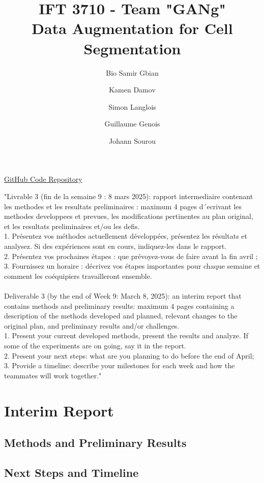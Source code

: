 \documentclass[]{article}
\title{\textbf{IFT 3710 - Team "GANg"} \\ 
\textbf{Data Augmentation for Cell Segmentation}}
\author[1]{Bio Samir Gbian}
\author[1]{Kamen Damov}
\author[1]{Simon Langlois}
\author[1]{Guillaume Genois}
\author[1]{Johann Sourou}
\affil{Departement of Computer Science and Operations Research}
\affil[1]{University of Montreal}
\begin{document}
\maketitle

\href{https://github.com/KamenDamov/IFT3710-Advanced-Project-in-ML-AI}{GitHub Code Repository}

"Livrable 3 (fin de la semaine 9 : 8 mars 2025): rapport intermediaire contenant les methodes et les resultats preliminaires : maximum 4 pages d´ecrivant les methodes developpees et prevues, les modifications pertinentes au plan original, et les resultats preliminaires et/ou les defis.
\\
1. Présentez vos méthodes actuellement développées, présentez les résultats et analysez. Si des expériences sont en cours, indiquez-les dans le rapport.
\\
2. Présentez vos prochaines étapes : que prévoyez-vous de faire avant la fin avril ;
\\
3. Fournissez un horaire : décrivez vos étapes importantes pour chaque semaine et comment les coéquipiers travailleront ensemble.
\\
\\
Deliverable 3 (by the end of Week 9: March 8, 2025): an interim report that contains methods and preliminary results: maximum 4 pages containing a description of the methods developed and planned, relevant changes to the original plan, and preliminary results and/or challenges.
\\
1. Present your current developed methods, present the results and analyze. If some of the experiments are on going, say it in the report.
\\
2. Present your next steps: what are you planning to do before the end of April;
\\
3. Provide a timeline: describe your milestones for each week and how the teammates will work together."

\section{Interim Report}
\subsection{Methods and Preliminary Results}
\subsection{Next Steps and Timeline}
\end{document}

